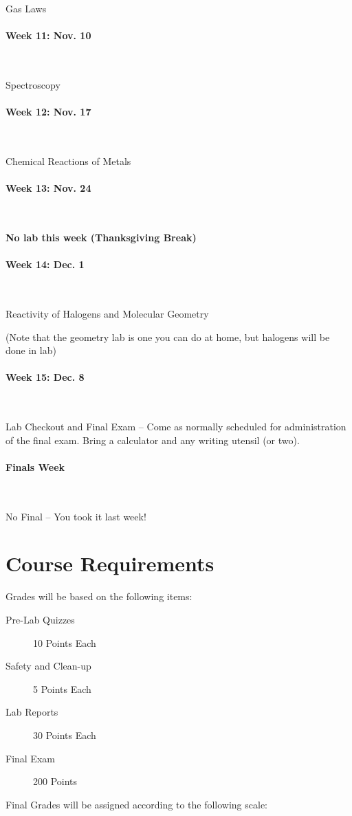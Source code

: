 \documentclass[12pt, letterpaper]{article}
\begin{document}
Gas Laws

\paragraph{Week 11: Nov. 10}~

Spectroscopy

\paragraph{Week 12: Nov. 17}~

Chemical Reactions of Metals

\paragraph{Week 13: Nov. 24}~

\textbf{No lab this week (Thanksgiving Break)}

\paragraph{Week 14: Dec. 1}~

Reactivity of Halogens and Molecular Geometry

(Note that the geometry lab is one you can do at home, but halogens will be done in lab)

\paragraph{Week 15: Dec. 8}~

Lab Checkout and Final Exam -- Come as normally scheduled for administration of the final exam. Bring a calculator and any writing utensil (or two).

\paragraph{Finals Week}~

No Final -- You took it last week!

\section*{Course Requirements}
Grades will be based on the following items:
\begin{description}
	\item[Pre-Lab Quizzes] 10 Points Each
	\item[Safety and Clean-up] 5 Points Each
	\item[Lab Reports] 30 Points Each
	\item[Final Exam] 200 Points
\end{description}
Final Grades will be assigned according to the following scale:
\end{document}
